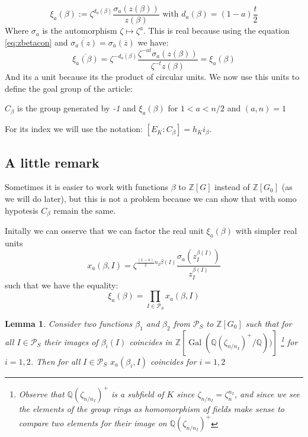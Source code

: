 \documentclass[]{article}
\theoremstyle{plain}
\newtheorem{lem}[teo]{Lemma}
\theoremstyle{remark}
\theoremstyle{definition}
\newcommand{\PS}{\mathcal{P}_S}
\newcommand{\Z}{\mathbb{Z}}
\newcommand{\Q}{\mathbb{Q}}
\DeclareMathOperator{\Gal}{Gal}
\begin{document}
	\begin{equation}\label{eq:xi}
		\xi_a (\beta) := \zeta ^{d_a (\beta)} \frac{\sigma_a (z(\beta))}{z(\beta)} \text{ with } d_a(\beta)= (1-a)\frac{t}{2}
	\end{equation}
	Where $\sigma_a$ is the automorphism $ \zeta \mapsto \zeta ^a $. This is real because using the equation \ref{eq:zbetacon} and $ \overline{\sigma_a(z)}= \sigma_a(\overline{z}) $ we have:
	\begin{equation}
		\overline{\xi_a(\beta)} = \zeta ^{-d_a(\beta)} \frac{\zeta^{-at} \sigma_a (z(\beta))}{\zeta^{-t} z(\beta)} = \xi_a(\beta)
	\end{equation}
 	And its a unit because its the product of circular units. %
 	We now use this units to define the goal group of the article:
 	\begin{tcolorbox}
 		$C_\beta $ is the group generated by \textit{-1} and $ \xi_a (\beta) $ for $ 1< a< n/2 $ and $ (a,n)=1 $
 	\end{tcolorbox}
 	For its index we will use the notation: $ [E_K : C_\beta] = h_K i_\beta $. 

	\subsection{A little remark}
	
	Sometimes it is easier to work with functions $\beta$ to $ \Z [G] $ instead of $ \Z [G_0] $ (as we will do later), but this is not a problem because we can show that with somo hypotesis $ C_\beta $ remain the same. 
	
	Initally we can osserve that we can factor the real unit $\xi_a(\beta)$ with simpler real units
	\begin{equation*}
		x_a(\beta , I) = \zeta ^{\frac{(1-a)}{2} n_I \beta (I)} \frac{\sigma_a (	z_I ^{\beta(I)})}{z_I ^{\beta(I)}} 
	\end{equation*}
	such that we have the equality:
	\begin{equation}\label{eq:fact_xi}
		 \xi_a(\beta) = \prod_{I \in \PS}  x_a(\beta , I)
	\end{equation} 
	
	\begin{lem}
		Consider two functions $ \beta_1 $ and $ \beta_2 $ from $ \PS $ to $ \Z[G_0] $ such that for all $ I \in \PS $ their images of $ \beta_i (I)$ coincides in $ \Z[\Gal( \Q(\zeta_{n/n_I})^+ / \Q   ))] $ \footnote{Observe that $ \Q(\zeta_{n/n_I})^+ $ is a subfield of $ K $ since $ \zeta_{n/n_I} =  \zeta_n^{n_I}$, and since we see the elements of the group rings as homomorphism of fields make sense to compare two elements for their image on $\Q(\zeta_{n/n_I})^+ $ %
		} for $ i= 1,2 $. Then for all $ I \in \PS $ $ x_a(\beta_i, I) $ coincides for $ i=1,2 $
	\end{lem}
\end{document}
